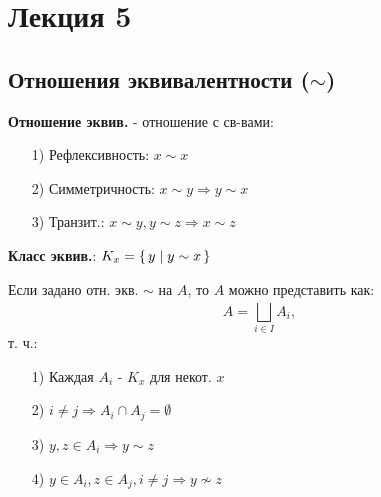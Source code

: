 \section{Лекция 5}
\subsection{Отношения эквивалентности ($\sim$)}
\begin{definition}
\textbf{Отношение эквив.} - отношение с св-вами:
\begin{itemize}
  \item [1) ] Рефлексивность: $ x \sim x$
  \item [2) ] Симметричность: $x \sim y \Rightarrow y \sim x$
  \item [3) ] Транзит.: $x \sim y, y \sim z \Rightarrow x \sim z$
\end{itemize}
\end{definition}
\begin{definition}
\textbf{Класс эквив.}: $K_x = \set{y | y \sim x}$
\end{definition}
\begin{theorem}
Если задано отн. экв. $\sim$ на $A$, то $A$ можно представить как:
\[
A = \bigsqcup_{i \in I}^{} A_i,
\]
т. ч.:
\begin{itemize}
  \item [1) ] Каждая $A_i$ - $K_x$ для некот. $x$
  \item [2) ] $i \neq j \Rightarrow A_i \cap A_j = \emptyset$
  \item [3) ] $y, z \in A_i \Rightarrow y \sim z$
  \item [4) ] $y \in A_i, z \in A_j, i \neq j \Rightarrow y \not\sim z$
\end{itemize}
\end{theorem}

